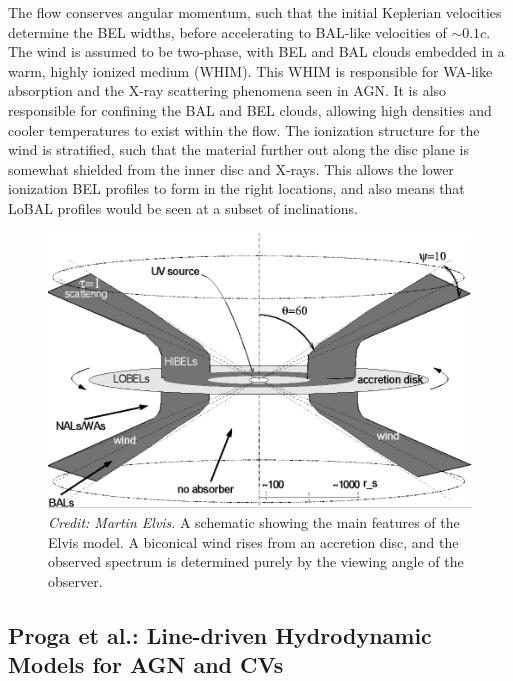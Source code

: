 The flow conserves angular momentum, such that the initial Keplerian velocities
determine the BEL widths, before accelerating to BAL-like velocities of $\sim0.1c$.
The wind is assumed to be two-phase, with BEL and BAL clouds embedded in 
a warm, highly ionized medium (WHIM). This WHIM is responsible for WA-like absorption
and the X-ray scattering phenomena seen in AGN. It is also responsible for confining
the BAL and BEL clouds, allowing high densities and cooler temperatures to exist
within the flow. The ionization structure for the wind is stratified, such that the material
further out along the disc plane is somewhat shielded from the inner disc and X-rays.
This allows the lower ionization BEL profiles to form in the right locations,
and also means that LoBAL profiles would be seen at a subset of inclinations.

\begin{figure}
\centering
\includegraphics[width=1.0\textwidth]{figures/02-outflows/elvis.png}
\caption
{
{\sl Credit: Martin Elvis}. 
A schematic showing the main features of the Elvis model. A biconical
wind rises from an accretion disc, and the observed spectrum is determined 
purely by the viewing angle of the observer.
} 
\label{fig:elvis}
\end{figure}

\subsection{Proga et al.: Line-driven Hydrodynamic Models for AGN and CVs}
\label{sec:proga}

